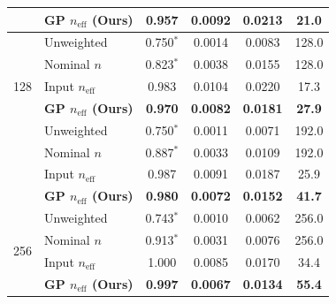 \begin{table}[!htbp]
{\begin{tabular}{@{}llcccc@{}}
& \textbf{GP $n_{\mathrm{eff}}$ (Ours)} & \textbf{0.957} & \textbf{0.0092} & \textbf{0.0213} & \textbf{21.0} \\
\midrule
\multirow{5}{*}{128} 
& Unweighted         & 0.750$^*$ & 0.0014 & 0.0083 & 128.0 \\
& Nominal $n$        & 0.823$^*$ & 0.0038 & 0.0155 & 128.0 \\
& Input $n_{\mathrm{eff}}$ & 0.983     & 0.0104 & 0.0220 & 17.3 \\
& \textbf{GP $n_{\mathrm{eff}}$ (Ours)} & \textbf{0.970} & \textbf{0.0082} & \textbf{0.0181} & \textbf{27.9} \\
\midrule
\multirow{5}{*}{192} 
& Unweighted         & 0.750$^*$ & 0.0011 & 0.0071 & 192.0 \\
& Nominal $n$        & 0.887$^*$ & 0.0033 & 0.0109 & 192.0 \\
& Input $n_{\mathrm{eff}}$ & 0.987     & 0.0091 & 0.0187 & 25.9 \\
& \textbf{GP $n_{\mathrm{eff}}$ (Ours)} & \textbf{0.980} & \textbf{0.0072} & \textbf{0.0152} & \textbf{41.7} \\
\midrule
\multirow{5}{*}{256} 
& Unweighted         & 0.743$^*$ & 0.0010 & 0.0062 & 256.0 \\
& Nominal $n$        & 0.913$^*$ & 0.0031 & 0.0076 & 256.0 \\
& Input $n_{\mathrm{eff}}$ & 1.000     & 0.0085 & 0.0170 & 34.4 \\
& \textbf{GP $n_{\mathrm{eff}}$ (Ours)} & \textbf{0.997} & \textbf{0.0067} & \textbf{0.0134} & \textbf{55.4} \\
\bottomrule
\end{tabular}}
\end{table}